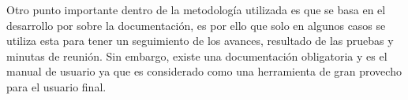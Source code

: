Otro punto importante dentro de la metodología utilizada es que se basa en el desarrollo por sobre la documentación, es por ello que solo en algunos casos se utiliza esta para tener un seguimiento de los avances, resultado de las pruebas y minutas de reunión. Sin embargo, existe una documentación obligatoria y es el manual de usuario ya que es considerado como una herramienta de gran provecho para el usuario final.